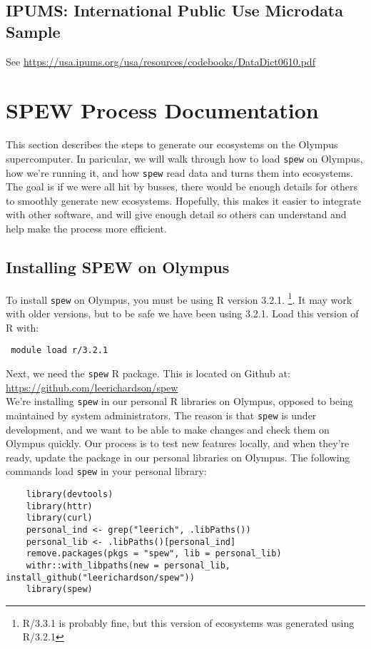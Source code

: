 \documentclass{article}
\begin{document}
\subsection{IPUMS: International Public Use Microdata Sample}
	See \url{https://usa.ipums.org/usa/resources/codebooks/DataDict0610.pdf}


\newpage 
\section{SPEW Process Documentation}
This section describes the steps to generate our ecosystems on the Olympus supercomputer. In paricular, we will walk through how to load \verb|spew| on Olympus, how we're running it, and how \verb|spew| read data and turns them into ecosystems. The goal is if we were all hit by busses, there would be enough details for others to smoothly generate new ecosystems. Hopefully, this makes it easier to integrate with other software, and will give enough detail so others can understand and help make the process more efficient. 

\subsection{Installing SPEW on Olympus}
To install \verb|spew| on Olympus, you must be using R version 3.2.1. \footnote{R/3.3.1 is probably fine, but this version of ecosystems was generated using R/3.2.1}. It may work with older versions, but to be safe we have been using 3.2.1. Load this version of R with: 

\begin{verbatim} module load r/3.2.1 \end{verbatim}

Next, we need the \verb|spew| R package. This is located on Github at: \\

\url{https://github.com/leerichardson/spew} \\

We're installing \verb|spew| in our personal R libraries on Olympus, opposed to being maintained by system administrators. The reason is that \verb|spew| is under development, and we want to be able to make changes and check them on Olympus quickly. Our process is to test new features locally, and when they're ready, update the package in our personal libraries on Olympus. The following commands load \verb|spew| in your personal library:

\begin{verbatim}
	library(devtools)
	library(httr)
	library(curl)
	personal_ind <- grep("leerich", .libPaths())
	personal_lib <- .libPaths()[personal_ind]
	remove.packages(pkgs = "spew", lib = personal_lib)
	withr::with_libpaths(new = personal_lib, install_github("leerichardson/spew"))
	library(spew)
\end{verbatim}
\end{document}
